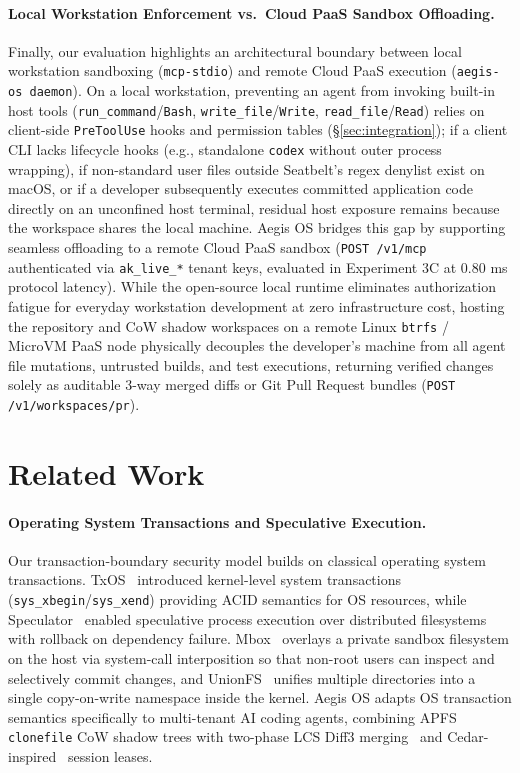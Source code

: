 \documentclass[10pt,twocolumn]{article}
\begin{document}
\paragraph{Local Workstation Enforcement vs.\ Cloud PaaS Sandbox Offloading.} Finally, our evaluation highlights an architectural boundary between local workstation sandboxing (\texttt{mcp-stdio}) and remote Cloud PaaS execution (\texttt{aegis-os daemon}). On a local workstation, preventing an agent from invoking built-in host tools (\texttt{run\_command}/\texttt{Bash}, \texttt{write\_file}/\texttt{Write}, \texttt{read\_file}/\texttt{Read}) relies on client-side \texttt{PreToolUse} hooks and permission tables (\S\ref{sec:integration}); if a client CLI lacks lifecycle hooks (e.g., standalone \texttt{codex} without outer process wrapping), if non-standard user files outside Seatbelt's regex denylist exist on macOS, or if a developer subsequently executes committed application code directly on an unconfined host terminal, residual host exposure remains because the workspace shares the local machine. Aegis OS bridges this gap by supporting seamless offloading to a remote Cloud PaaS sandbox (\texttt{POST /v1/mcp} authenticated via \texttt{ak\_live\_*} tenant keys, evaluated in Experiment 3C at 0.80 ms protocol latency). While the open-source local runtime eliminates authorization fatigue for everyday workstation development at zero infrastructure cost, hosting the repository and CoW shadow workspaces on a remote Linux \texttt{btrfs} / MicroVM PaaS node physically decouples the developer's machine from all agent file mutations, untrusted builds, and test executions, returning verified changes solely as auditable 3-way merged diffs or Git Pull Request bundles (\texttt{POST /v1/workspaces/pr}).

\section{Related Work}
\label{sec:related}

\paragraph{Operating System Transactions and Speculative Execution.} Our transaction-boundary security model builds on classical operating system transactions. TxOS~\cite{porter2009txos} introduced kernel-level system transactions (\texttt{sys\_xbegin}/\texttt{sys\_xend}) providing ACID semantics for OS resources, while Speculator~\cite{nightingale2005speculator} enabled speculative process execution over distributed filesystems with rollback on dependency failure. Mbox~\cite{kim2013mbox} overlays a private sandbox filesystem on the host via system-call interposition so that non-root users can inspect and selectively commit changes, and UnionFS~\cite{wright2004unionfs} unifies multiple directories into a single copy-on-write namespace inside the kernel. Aegis OS adapts OS transaction semantics specifically to multi-tenant AI coding agents, combining APFS \texttt{clonefile} CoW shadow trees with two-phase LCS Diff3 merging~\cite{khanna2007formal,apel2011semistructured} and Cedar-inspired~\cite{cutler2024cedar} session leases.
\end{document}

